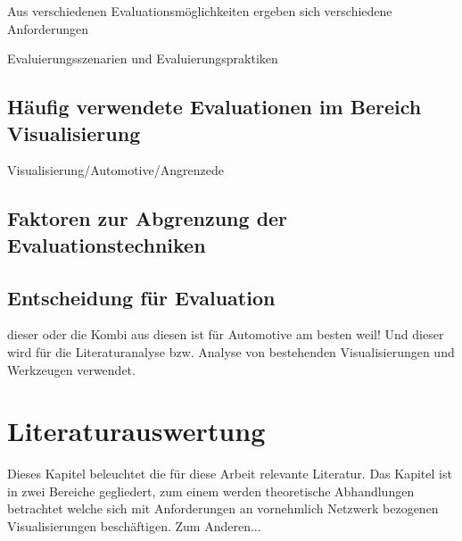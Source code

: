 \documentclass[draft=false
              ,paper=a4
              ,twoside=false
              ,fontsize=11pt
              ,headsepline
              ,BCOR10mm
              ,DIV11
              ]{scrbook}
\begin{document}
Aus verschiedenen Evaluationsmöglichkeiten ergeben sich verschiedene Anforderungen

Evaluierungsszenarien und Evaluierungspraktiken
\fi

\section{Häufig verwendete Evaluationen im Bereich Visualisierung} %
\label{sec:häufig_verwendete_Evaluationen im Bereich Visualisierung}
Visualisierung/Automotive/Angrenzede

\section{Faktoren zur Abgrenzung der Evaluationstechniken} %
\label{sec:Faktoren zur Abgrenzung der Evaluationstechniken}


\section{Entscheidung für Evaluation} %
\label{sec:entscheidung_für_Evaluation}
dieser oder die Kombi aus diesen ist für Automotive am besten weil! Und dieser wird für die Literaturanalyse bzw. Analyse von bestehenden Visualisierungen und Werkzeugen verwendet.

\chapter{Literaturauswertung} %
\label{cha:literaturauswertung}

Dieses Kapitel beleuchtet die für diese Arbeit relevante Literatur. Das Kapitel ist in zwei Bereiche gegliedert, zum einem werden theoretische Abhandlungen betrachtet welche sich mit Anforderungen an vornehmlich Netzwerk bezogenen Visualisierungen beschäftigen. Zum Anderen...
\end{document}

